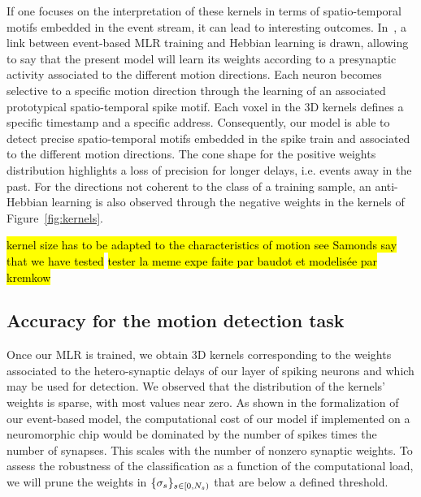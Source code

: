 \documentclass[default]{sn-jnl}%
\theoremstyle{thmstyleone}%
\theoremstyle{thmstyletwo}%
\theoremstyle{thmstylethree}%
\newcommand{\note}[1]{{\sethlcolor{yellow}\hl{#1}}}
\begin{document}
If one focuses on the interpretation of these kernels in terms of spatio-temporal motifs embedded in the event stream, it can lead to interesting outcomes. In~\citep{grimaldi_robust_2022}, a link between event-based MLR training and Hebbian learning is drawn, allowing to say that the present model will learn its weights according to a presynaptic activity associated to the different motion directions. Each neuron becomes selective to a specific motion direction through the learning of an associated prototypical spatio-temporal spike motif. Each voxel in the 3D kernels defines a specific timestamp and a specific address. Consequently, our model is able to detect precise spatio-temporal motifs embedded in the spike train and associated to the different motion directions. The cone shape for the positive weights distribution highlights a loss of precision for longer delays, i.e. events away in the past. For the directions not coherent to the class of a training sample, an anti-Hebbian learning is also observed through the negative weights in the kernels of Figure~\ref{fig:kernels}. 

%
\note{kernel size has to be adapted to the characteristics of motion see Samonds %
say that we have tested }
\note{tester la meme expe faite par baudot et modelisée par kremkow}

%
\subsection{Accuracy for the motion detection task}

Once our MLR is trained, we obtain 3D kernels corresponding to the weights associated to the hetero-synaptic delays of our layer of spiking neurons and which may be used for detection. We observed that the distribution of the kernels' weights is sparse, with most values near zero. As shown in the formalization of our event-based model, the computational cost of our model if implemented on a neuromorphic chip would be dominated by the number of spikes times the number of synapses. This scales with the number of nonzero synaptic weights. To  assess the robustness of the classification as a function of the computational load, we will prune the weights in $\{\sigma_s\}_{s \in [0,N_{s})}$ that are below a defined threshold. 
\end{document}

